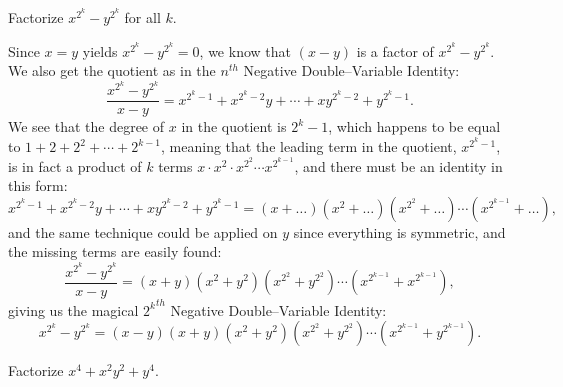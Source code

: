 \documentclass[12pt,a4paper]{memoir}
\theoremstyle{definition}
\begin{document}
	
	
	\setcounter{question}{54}
	
	
	
	\begin{tcolorbox}
		\begin{question}%
			Factorize $x^{2^k}-y^{2^k}$ for all $k$.
		\end{question}
	\end{tcolorbox}
	
	\begin{solution}[name=Solution by Amir Parvardi]
		Since $x=y$ yields $x^{2^k}-y^{2^k}=0$, we know that $(x-y)$ is a factor of $x^{2^k}-y^{2^k}$. We also get the quotient as in the $n^{th}$ Negative Double--Variable Identity:
		$$\frac{x^{2^k}-y^{2^k}}{x-y} = x^{2^k-1}+x^{2^k-2}y+\cdots+xy^{2^k-2}+y^{2^k-1}.$$
		We see that the degree of $x$ in the quotient is $2^k-1$, which happens to be equal to $1+2+2^2+\cdots+2^{k-1}$, meaning that the leading term in the quotient, $x^{2^k-1}$, is in fact a product of $k$ terms $x \cdot x^2 \cdot x^{2^2} \cdots x^{2^{k-1}}$, and there must be an identity in this form:
		$$ x^{2^k-1}+x^{2^k-2}y+\cdots+xy^{2^k-2}+y^{2^k-1} = (x+\dots)(x^2+\dots)(x^{2^2}+\dots)\cdots (x^{2^{k-1}}+\dots),$$
		and the same technique could be applied on $y$ since everything is symmetric, and the missing terms are easily found:
		$$\frac{x^{2^k}-y^{2^k}}{x-y} =  (x+y)(x^2+y^2)(x^{2^2}+y^{2^2})\cdots (x^{2^{k-1}}+x^{2^{k-1}}),$$
		giving us the magical ${2^k}^{th}$ Negative Double--Variable Identity:
		$$x^{2^k}-y^{2^k} = (x-y)(x+y)(x^2+y^2)(x^{2^2}+y^{2^2})\cdots (x^{2^{k-1}}+y^{2^{k-1}}).$$
	\end{solution}
	
		\setcounter{question}{56}
	
	\begin{tcolorbox}
		\SetupExSheets{headings=runin}
		\begin{question}[name=Sophie Parker Identity]
			Factorize $x^4+x^2y^2+y^4$.
		\end{question}
	\end{tcolorbox}
	
\end{document}
